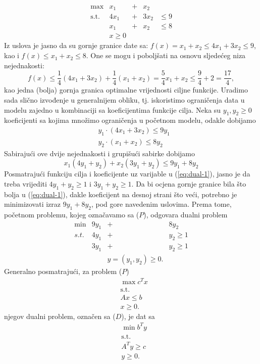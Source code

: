 \documentclass[a4paper, utf8, 11pt, colorlinks]{book}
\begin{document}
$$ 
\begin{array}{lllll}
    \max                  &x_1 &+& x_2   &               \\
    \mbox{s.t.}  &4x_1 & +&3 x_2 & \leq 9        \\
                          &x_1 &+ &x_2   &  \leq 8       \\
                          &x \geq 0  &  &     &      
 \end{array}
$$
Iz uslova je jasno da su gornje granice date sa: $f(x) = x_1 + x_2 \leq 4 x_1 + 3 x_2 \leq 9$, kao i 
$f(x) \leq x_1 + x_2 \leq 8$. One se mogu i poboljšati na osnovu sljedećeg niza nejednakosti:
$$f(x) \leq \frac{1}{4}(  4 x_1 + 3 x_2  ) + \frac{1}{4}(    x_1 +   x_2 ) = \frac{5}{4}x_1 + x_2 \leq  \frac{9}{4} + 2 = \frac{17}{4},$$ kao jedna (bolja) gornja granica optimalne vrijednosti ciljne funkcije. 
Uradimo sada slično izvođenje u generalnijem obliku, tj. iskoristimo ograničenja data u modelu zajedno u kombinaciji sa koeficijentima funkcije cilja. Neka su $y_1, y_2 \geq 0$ koeficijenti sa kojima množimo ograničenja u početnom modelu, odakle dobijamo 
\begin{align*}
    &y_1 \cdot (4x_1 + 3x_2) \leq 9 y_1 \\
    &y_2 \cdot (x_1 + x_2 ) \leq 8 y_2 
\end{align*}
Sabirajući ove dvije nejednakosti i grupišući sabirke dobijamo 
\begin{equation}\label{eq:dual-1}
     x_1 ( 4 y_1 + y_2 ) + x_2 ( 3 y_1 + y_2 ) \leq 9 y_1 + 8 y_2 
\end{equation}
Posmatrajući funkciju cilja i koeficijente uz varijable u (\ref{eq:dual-1}), jasno je da treba vrijediti 
$4 y_1 + y_2 \geq 1$ i $3 y_1 + y_2 \geq 1$. Da bi ocjena gornje granice bila što bolja u (\ref{eq:dual-1}), dakle koeficijent na desnoj strani što veći, potrebno je minimizovati izraz $9y_1 + 8 y_2$, pod gore navedenim uslovima. Prema tome, početnom problemu, kojeg označavamo sa ($P$), odgovara dualni problem 
$$\begin{array}{cccc}
     \min                    &  9 y_1 &+& 8 y_2        \\
     {s.t. }     &  4 y_1    & +  & y_2 \geq 1   \\
                             &  3 y_1 &+& y_2 \geq 1 \\
                 &           &y=(y_1,y_2) \geq 0.  & 
\end{array}$$
Generalno posmatrajući,  za problem ($P$) %
\begin{align}
	& \max c^T x  \\
	& \mbox{s.t.} \nonumber \\
	& A x \leq b \\
	& x \geq 0.
\end{align}
njegov dualni problem, označen sa ($D$), je dat sa 
\begin{align}
     & \min b^T y  \\
     & \mbox{s.t.} \nonumber \\
     & A^T y \geq c \\
     & y \geq 0.
\end{align}
\end{document}
